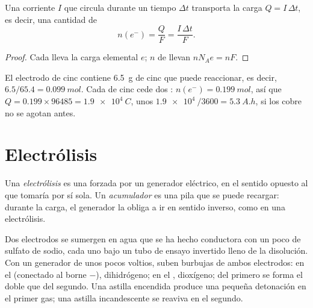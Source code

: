 \begin{proposition}\label{prop:g12:cells-and-electrolysis:charge}
Una corriente $I$ que circula durante un tiempo $\Delta t$ transporta la
carga $Q = I\,\Delta t$, es decir, una cantidad de 
\[
  n(e^-) = \frac{Q}{F} = \frac{I\,\Delta t}{F} .
\]
\end{proposition}

\begin{proof}
Cada  lleva la carga elemental $e$; $n$  de 
llevan $n N_A e = n F$.
\end{proof}

\begin{example}\label{ex:g12:cells-and-electrolysis:capacity}
El electrodo de cinc contiene \qty{6.5}{g} de cinc que puede reaccionar,
es decir, $6.5/65.4 = \qty{0.099}{mol}$. Cada  de cinc cede dos
: $n(e^-) = \qty{0.199}{mol}$, así que
$Q = 0.199 \times 96485 = \qty{1.9e4}{C}$, unos
$\qty{1.9e4}{}/3600 = \qty{5.3}{A.h}$, si los  cobre no se agotan
antes.
\end{example}

\section{Electrólisis}

\begin{definition}\label{def:g12:cells-and-electrolysis:electrolysis}
Una \emph{electrólisis} es una  forzada
por un generador eléctrico, en el sentido opuesto al que tomaría por sí
sola. Un \emph{acumulador} es una pila que se puede
recargar: durante la carga, el generador la obliga a ir en sentido
inverso, como en una electrólisis.
\end{definition}

\begin{inthelab}
Dos electrodos se sumergen en agua que se ha hecho conductora con un poco
de sulfato de sodio, cada uno bajo un tubo de ensayo invertido lleno de
la disolución. Con un generador de unos pocos voltios, suben burbujas de
ambos electrodos: en el  (conectado al borne $-$), dihidrógeno; en
el , dioxígeno; del primero se forma el doble que del segundo. Una
astilla encendida produce una pequeña detonación en el primer gas; una
astilla incandescente se reaviva en el segundo.
\end{inthelab}

